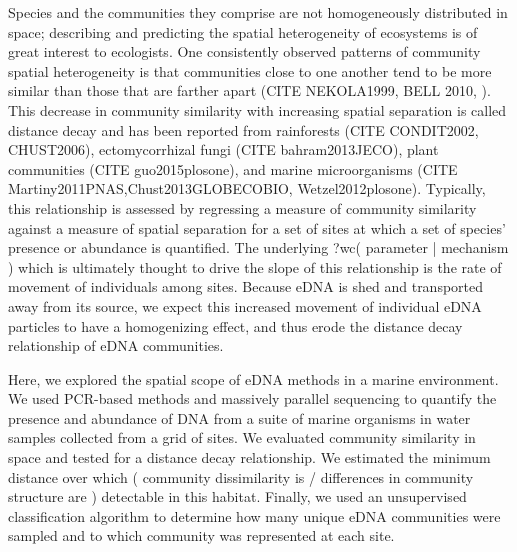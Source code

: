 \documentclass[11pt,letterpaper]{article} %
\begin{document}
Species and the communities they comprise are not homogeneously distributed in space; describing and predicting the spatial heterogeneity of ecosystems is of great interest to ecologists.
One consistently observed patterns of community spatial heterogeneity is that communities close to one another tend to be more similar than those that are farther apart (CITE NEKOLA1999, BELL 2010, ).
This decrease in community similarity with increasing spatial separation is called distance decay and has been reported from rainforests (CITE CONDIT2002, CHUST2006), ectomycorrhizal fungi (CITE bahram2013JECO), plant communities (CITE guo2015plosone), and marine microorganisms (CITE Martiny2011PNAS,Chust2013GLOBECOBIO, Wetzel2012plosone). %
Typically, this relationship is assessed by regressing a measure of community similarity against a measure of spatial separation for a set of sites at which a set of species' presence or abundance is quantified.
The underlying ?wc( parameter | mechanism ) which is ultimately thought to drive the slope of this relationship is the rate of movement of individuals among sites.
Because eDNA is shed and transported away from its source, we expect this increased movement of individual eDNA particles to have a homogenizing effect, and thus erode the distance decay relationship of eDNA communities.

Here, we explored the spatial scope of eDNA methods in a marine environment.
We used PCR-based methods and massively parallel sequencing to quantify the presence and abundance of DNA from a suite of marine organisms in water samples collected from a grid of sites. %
We evaluated community similarity in space and tested for a distance decay relationship.
We estimated the minimum distance over which ( community dissimilarity is / differences in community structure are ) detectable in this habitat.
Finally, we used an unsupervised classification algorithm to determine how many unique eDNA communities were sampled and to which community was represented at each site.
\end{document}
